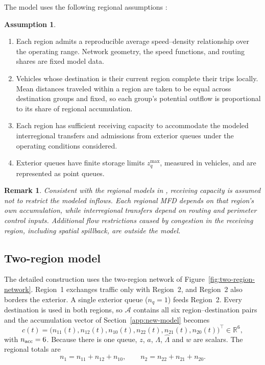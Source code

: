 \documentclass[final]{cas-sc}
\theoremstyle{definition}
\newtheorem{assumption}{Assumption}
\theoremstyle{plain}
\newtheorem{remark}{Remark}
\theoremstyle{definition}
\theoremstyle{plain}
\newcommand{\R}{\mathbb{R}}
\begin{document}
The model uses the following regional assumptions
\cite{geroliminis2011properties,geroliminis2013mpc,mohajerpoor2020hinf}:
\begin{assumption}
\label{ass:regional-model}
\begin{enumerate}
\renewcommand{\labelenumi}{(\alph{enumi})}
\item Each region admits a reproducible average speed--density
relationship over the operating range. Network geometry, the speed
functions, and routing shares are fixed model data.
\item Vehicles whose destination is their current region complete their
trips locally. Mean distances traveled within a region are taken to be
equal across destination groups and fixed, so each group's potential
outflow is proportional to its share of regional accumulation.
\item Each region has sufficient receiving capacity to accommodate
the modeled interregional transfers and admissions from exterior
queues under the operating conditions considered.
\item Exterior queues have finite storage limits $z_q^{\max}$,
measured in vehicles, and are represented as point queues.
\end{enumerate}
\end{assumption}

\begin{remark}
Consistent with the regional models in
\cite{zhong2018robust,mohajerpoor2020hinf}, receiving capacity is
assumed not to restrict the modeled inflows. Each regional MFD
depends on that region's own accumulation, while interregional
transfers depend on routing and perimeter control inputs.
Additional flow restrictions caused by congestion in the receiving
region, including spatial spillback, are outside the model.
\end{remark}

\subsection{Two-region model}
\label{sec:two-region-model}

The detailed construction uses the two-region network of
Figure~\ref{fig:two-region-network}. Region~1 exchanges traffic only with
Region~2, and Region~2 also borders the exterior. A single exterior
queue ($n_q=1$) feeds Region~2. Every destination is used in both
regions, so $\mathcal A$ contains all six region--destination pairs and
the accumulation vector of Section~\ref{app:new-model} becomes
\[
c(t)=\big(n_{11}(t),n_{12}(t),n_{10}(t),n_{22}(t),n_{21}(t),n_{20}(t)\big)^\top
\in\R^{6},
\]
with $n_{\rm acc}=6$. Because there is one queue, $z$, $a$, $\Lambda$,
$\widehat\Lambda$ and $w$ are scalars. The regional totals are
\begin{equation}
n_1=n_{11}+n_{12}+n_{10},\qquad n_2=n_{22}+n_{21}+n_{20}.
\label{eq:regional-class-totals}
\end{equation}
\end{document}
